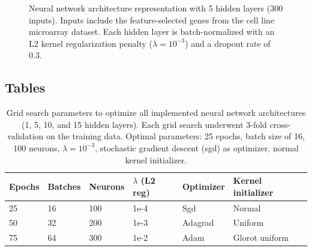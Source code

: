 \documentclass[10pt, letterpaper, twocolumn]{article}
\begin{document}
\begin{figure}[ht]
    \caption{Neural network architecture representation with 5 hidden layers (300 inputs). Inputs include the feature-selected genes from the cell line microarray dataset. Each hidden layer is batch-normalized with an L2 kernel regularization penalty ($\lambda=10^{-3}$) and a dropout rate of 0.3.}
    \label{fig:neural_vis}
\end{figure}

\subsection{Tables}
\begin{table}[ht]
    \caption{Grid search parameters to optimize all implemented neural network architectures (1, 5, 10, and 15 hidden layers). Each grid search underwent 3-fold cross-validation on the training data. Optimal parameters: 25 epochs, batch size of 16, 100 neurons, $\lambda=10^{-3}$, stochastic gradient descent (sgd) as optimizer, normal kernel initializer.}
    \centering
    \label{tab:params}
    \begin{tabular}{l l l l l l}
        \toprule
        Epochs & Batches & Neurons & $\lambda$ (L2 reg) & Optimizer & Kernel initializer \\
        \midrule
        25 & 16 & 100 & 1e-4 & Sgd & Normal \\
        50 & 32 & 200 & 1e-3 & Adagrad & Uniform \\
        75 & 64 & 300 & 1e-2 & Adam & Glorot uniform \\
        \bottomrule
    \end{tabular}
\end{table}
\end{document}
